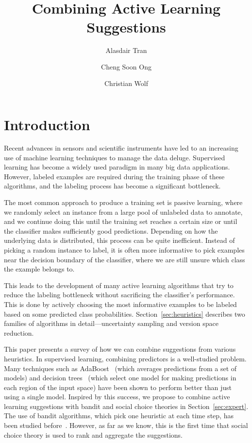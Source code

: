 \documentclass[fleqn,10pt,lineno]{wlpeerj} %
\title{Combining Active Learning Suggestions}
\author[1]{Alasdair Tran}
\author[2, 3]{Cheng Soon Ong}
\author[3]{Christian Wolf}
\affil[1]{Research School of Computer Science, Australian National University}
\affil[2]{Machine Learning Research Group, Data61, CSIRO, Australia}
\affil[3]{Research School of Astronomy and Astrophysics, Australian National
          University}
\begin{document}
\flushbottom
\maketitle
\thispagestyle{empty}

\section{Introduction}
Recent advances in sensors and scientific instruments have led to an increasing
use of machine learning techniques to manage the data deluge. Supervised
learning has become a widely used paradigm in many big data applications.
However, labeled examples are required during the training phase of these
algorithms, and the labeling process has become a significant bottleneck.

The most common approach to produce a training set is passive learning, where
we randomly select an instance from a large pool of unlabeled data to annotate,
and we continue doing this until the training set reaches a certain size or
until the classifier makes sufficiently good predictions. Depending on how the
underlying data is distributed, this process can be quite inefficient. Instead
of picking a random instance to label, it is often more informative to pick
examples near the decision boundary of the classifier, where we are still
unsure which class the example belongs to.

This leads to the development of many active learning algorithms that try to
reduce the labeling bottleneck without sacrificing the classifier's
performance. This is done by actively choosing the most informative examples to
be labeled based on some predicted class probabilities.
Section~\ref{sec:heuristics} describes two families of algorithms in
detail---uncertainty sampling and version space reduction.

This paper presents a survey of how we can combine suggestions from various
heuristics. In supervised learning, combining predictors is a well-studied
problem. Many techniques such as AdaBoost~\citep{freund96} (which averages
predictions from a set of models) and decision trees~\citep{breiman84} (which
select one model for making predictions in each region of the input space) have
been shown to perform better than just using a single model. Inspired by this
success, we propose to combine active learning suggestions with bandit and
social choice theories in Section~\ref{sec:expert}. The use of bandit
algorithms, which pick one heuristic at each time step, has been studied
before~\citep{baram04, hsu15}. However, as far as we know, this is the first
time that social choice theory is used to rank and aggregate the suggestions.
\end{document}
